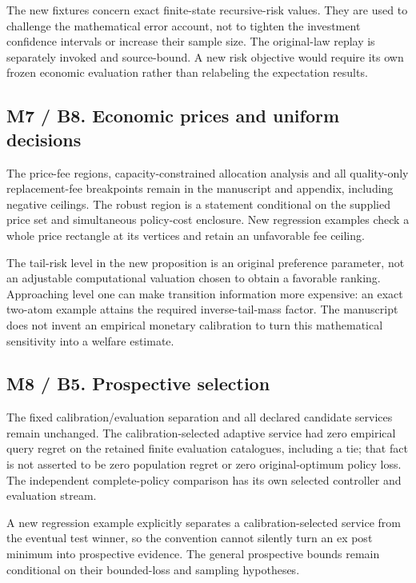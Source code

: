 The new fixtures concern exact finite-state recursive-risk values. They
are used to challenge the mathematical error account, not to tighten the
investment confidence intervals or increase their sample size. The
original-law replay is separately invoked and source-bound. A new risk
objective would require its own frozen economic evaluation rather than
relabeling the expectation results.

\hypertarget{m7-b8.-economic-prices-and-uniform-decisions}{%
\subsection{M7 / B8. Economic prices and uniform
decisions}\label{m7-b8.-economic-prices-and-uniform-decisions}}

The price-fee regions, capacity-constrained allocation analysis and all
quality-only replacement-fee breakpoints remain in the manuscript and
appendix, including negative ceilings. The robust region is a statement
conditional on the supplied price set and simultaneous policy-cost
enclosure. New regression examples check a whole price rectangle at its
vertices and retain an unfavorable fee ceiling.

The tail-risk level in the new proposition is an original preference
parameter, not an adjustable computational valuation chosen to obtain a
favorable ranking. Approaching level one can make transition information
more expensive: an exact two-atom example attains the required
inverse-tail-mass factor. The manuscript does not invent an empirical
monetary calibration to turn this mathematical sensitivity into a
welfare estimate.

\hypertarget{m8-b5.-prospective-selection}{%
\subsection{M8 / B5. Prospective
selection}\label{m8-b5.-prospective-selection}}

The fixed calibration/evaluation separation and all declared candidate
services remain unchanged. The calibration-selected adaptive service had
zero empirical query regret on the retained finite evaluation
catalogues, including a tie; that fact is not asserted to be zero
population regret or zero original-optimum policy loss. The independent
complete-policy comparison has its own selected controller and
evaluation stream.

A new regression example explicitly separates a calibration-selected
service from the eventual test winner, so the convention cannot silently
turn an ex post minimum into prospective evidence. The general
prospective bounds remain conditional on their bounded-loss and sampling
hypotheses.

